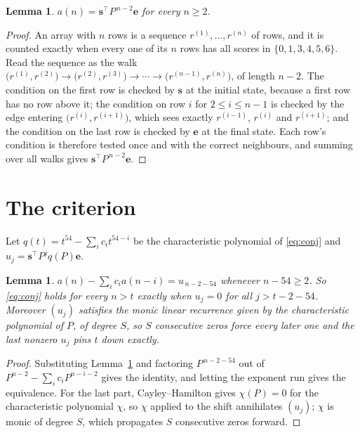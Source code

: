 \documentclass[11pt,a4paper]{article}
\theoremstyle{plain}
\newtheorem{lemma}[theorem]{Lemma}
\theoremstyle{definition}
\begin{document}
\begin{lemma}\label{lem:walk}
$a(n)=\mathbf{s}^{\!\top}P^{\,n-2}\mathbf{e}$ for every $n\ge2$.
\end{lemma}

\begin{proof}
An array with $n$ rows is a sequence $r^{(1)},\dots,r^{(n)}$ of rows, and it is counted
exactly when every one of its $n$ rows has all scores in $\{0,1,3,4,5,6\}$. Read the sequence as the
walk $\bigl(r^{(1)},r^{(2)}\bigr)\to\bigl(r^{(2)},r^{(3)}\bigr)\to\cdots\to
\bigl(r^{(n-1)},r^{(n)}\bigr)$, of length $n-2$. The condition on the first row is
checked by $\mathbf{s}$ at the initial state, because a first row has no row above it; the
condition on row $i$ for $2\le i\le n-1$ is checked by the edge entering
$\bigl(r^{(i)},r^{(i+1)}\bigr)$, which sees exactly $r^{(i-1)}$, $r^{(i)}$ and
$r^{(i+1)}$; and the condition on the last row is checked by $\mathbf{e}$ at the final
state. Each row's condition is therefore tested once and with the correct neighbours, and
summing over all walks gives $\mathbf{s}^{\!\top}P^{\,n-2}\mathbf{e}$.
\end{proof}

\section{The criterion}

Let $q(t)=t^{54}-\sum_i c_i t^{54-i}$ be the characteristic polynomial of
\eqref{eq:conj} and $u_j=\mathbf{s}^{\!\top}P^{j}q(P)\mathbf{e}$.

\begin{lemma}\label{lem:crit}
$a(n)-\sum_i c_i a(n-i)=u_{\,n-2-54}$ whenever $n-54\ge2$. So \eqref{eq:conj}
holds for every $n>t$ exactly when $u_j=0$ for all $j>t-2-54$. Moreover $(u_j)$
satisfies the monic linear recurrence given by the characteristic polynomial of $P$, of
degree $S$, so $S$ consecutive zeros force every later one and the last nonzero $u_j$ pins
$t$ down exactly.
\end{lemma}

\begin{proof}
Substituting Lemma~\ref{lem:walk} and factoring $P^{\,n-2-54}$ out of
$P^{n-2}-\sum_i c_i P^{n-i-2}$ gives the identity, and letting the exponent run gives the
equivalence. For the last part, Cayley--Hamilton gives $\chi(P)=0$ for the characteristic
polynomial $\chi$, so $\chi$ applied to the shift annihilates $(u_j)$; $\chi$ is monic of
degree $S$, which propagates $S$ consecutive zeros forward.
\end{proof}
\end{document}

